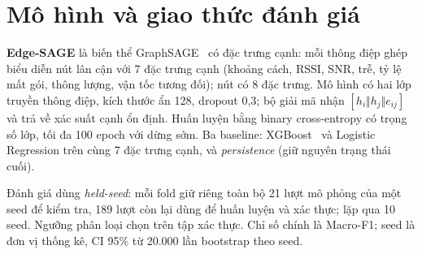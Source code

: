 \documentclass[12pt,a4paper]{report}
\begin{document}
\section{Mô hình và giao thức đánh giá}
\textbf{Edge-SAGE} là biến thể GraphSAGE~\cite{graphsage} có đặc trưng cạnh: mỗi thông điệp ghép biểu diễn nút lân cận với 7 đặc trưng cạnh (khoảng cách, RSSI, SNR, trễ, tỷ lệ mất gói, thông lượng, vận tốc tương đối); nút có 8 đặc trưng. Mô hình có hai lớp truyền thông điệp, kích thước ẩn 128, dropout 0,3; bộ giải mã nhận $[h_i\Vert h_j\Vert e_{ij}]$ và trả về xác suất cạnh ổn định. Huấn luyện bằng binary cross-entropy có trọng số lớp, tối đa 100 epoch với dừng sớm. Ba baseline: XGBoost~\cite{xgboost} và Logistic Regression trên cùng 7 đặc trưng cạnh, và \emph{persistence} (giữ nguyên trạng thái cuối).

Đánh giá dùng \emph{held-seed}: mỗi fold giữ riêng toàn bộ 21 lượt mô phỏng của một seed để kiểm tra, 189 lượt còn lại dùng để huấn luyện và xác thực; lặp qua 10 seed. Ngưỡng phân loại chọn trên tập xác thực. Chỉ số chính là Macro-F1; seed là đơn vị thống kê, CI 95\% từ 20.000 lần bootstrap theo seed.
\end{document}
